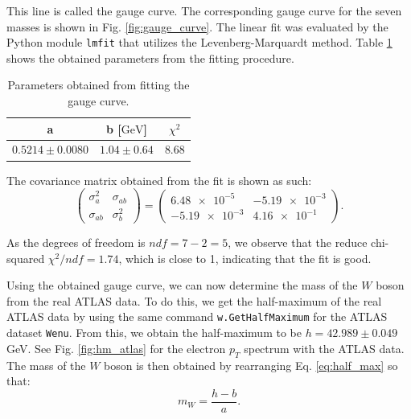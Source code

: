 \documentclass[a4paper]{report}
\numberwithin{equation}{section}
\begin{document}
This line is called the gauge curve. The corresponding gauge curve for the seven masses is shown in Fig. \ref{fig:gauge_curve}. The 
linear fit was evaluated by the Python module \texttt{lmfit} that utilizes the Levenberg-Marquardt method. Table \ref{tab:gauge_params} 
shows the obtained parameters from the fitting procedure.

\begin{table}[htb!]
    \centering
    \begin{tabular}{|c|c|c|} \hline
    a & b [$\si{\giga\electronvolt}$] &  $\chi^2$  \\ \hline
    $0.5214 \pm 0.0080$ & $1.04 \pm 0.64$  & 8.68  \\ \hline
    \end{tabular}
    \caption{Parameters obtained from fitting the gauge curve.}
    \label{tab:gauge_params}
\end{table}

The covariance matrix obtained from the fit is shown as such: 
\begin{equation}
    \begin{pmatrix}
        \sigma_a^2 & \sigma_{ab} \\ 
        \sigma_{ab} & \sigma_b^2 
    \end{pmatrix}
    =
    \begin{pmatrix}
        \num{6.48e-5} & \num{-5.19e-3} \\
        \num{-5.19e-3} & \num{4.16e-1}
    \end{pmatrix} .
    \label{eq:cov_matrix}
\end{equation}

As the degrees of freedom is $ndf = 7 - 2 = 5$, we observe that the reduce chi-squared $\chi^2 / ndf = 1.74$, which is close to 1, indicating that the fit is good.\par 

Using the obtained gauge curve, we can now determine the mass of the $W$ boson from the real ATLAS data. To do this, we get the 
half-maximum of the real ATLAS data by using the same command \texttt{w.GetHalfMaximum} for the ATLAS dataset \texttt{Wenu}. From this, 
we obtain the half-maximum to be $h = 42.989 \pm 0.049$ GeV. See Fig. \ref{fig:hm_atlas} for the electron $p_T$ spectrum with the ATLAS data. 
The mass of the $W$ boson is then obtained by rearranging Eq. \ref{eq:half_max} so that:
\begin{equation}
    m_W = \frac{h - b}{a}.
\end{equation} 
\end{document}
